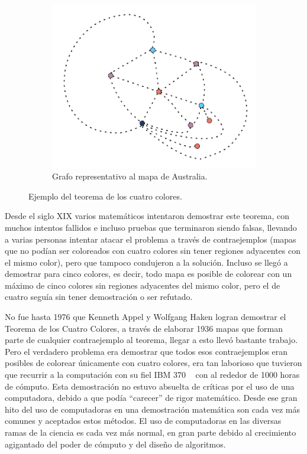 \begin{figure}[h]
    \begin{subfigure}[b]{0.28\linewidth}
    \includegraphics[width=\linewidth]{3/img/4_colors_australia_grafo}
    \caption{Grafo representativo al mapa de Australia.}
  \end{subfigure}
  \caption{Ejemplo del teorema de los cuatro colores.}
  \label{australia}
\end{figure}

Desde el siglo XIX varios matemáticos intentaron demostrar este teorema, con
muchos intentos fallidos e incluso pruebas que terminaron siendo falsas,
llevando a varias personas intentar atacar el problema a través de
contraejemplos (mapas que no podían ser coloreados con cuatro colores sin tener
regiones adyacentes con el mismo color), pero que tampoco condujeron a la
solución. Incluso se llegó a demostrar para cinco colores, es decir, todo mapa
es posible de colorear con un máximo de cinco colores sin regiones adyacentes
del mismo color, pero el de cuatro seguía sin tener demostración o ser
refutado.

No fue hasta 1976 que Kenneth Appel y Wolfgang Haken logran demostrar el
Teorema de los Cuatro Colores, a través de elaborar 1936 mapas  que forman
parte de cualquier contraejemplo al teorema, llegar a esto llevó bastante
trabajo. Pero el verdadero problema era demostrar que todos esos contraejemplos
eran posibles de colorear únicamente con cuatro colores, era tan laborioso que
tuvieron que recurrir a la computación con su fiel IBM 370 ~\cite{50cosas} con
al rededor de \SI{1000}{} horas de cómputo. Esta demostración no estuvo
absuelta de críticas por el uso de una computadora, debido a que podía
``carecer'' de rigor matemático.  Desde ese gran hito del uso de computadoras
en una demostración matemática son cada vez más comunes y aceptados estos
métodos. El uso de computadoras en las diversas ramas de la ciencia es cada vez
más normal, en gran parte debido al crecimiento agigantado del poder de cómputo
y del diseño de algoritmos.

